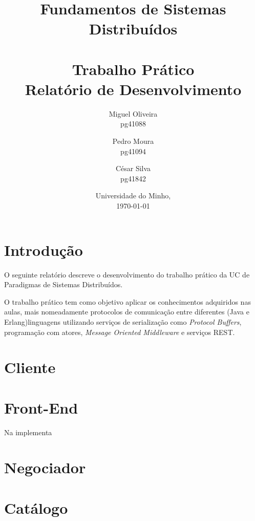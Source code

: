 \documentclass[12pt, a4paper]{report}
\begin{document}
\title{
    Fundamentos de Sistemas Distribuídos\\
    \textbf{\\Trabalho Prático}
    \large{\\Relatório de Desenvolvimento}
}

\author{
    Miguel Oliveira\\ pg41088
    \and Pedro Moura\\ pg41094
    \and César Silva\\ pg41842
}
\date{Universidade do Minho,\\\today}

\maketitle

\tableofcontents

\chapter{Introdução}
O seguinte relatório descreve o desenvolvimento do trabalho prático da UC de Paradigmas de Sistemas Distribuídos.

O trabalho prático tem como objetivo aplicar os conhecimentos adquiridos nas aulas, mais nomeadamente protocolos de comunicação entre diferentes  (Java e Erlang)linguagens utilizando serviços de serialização como \textit{Protocol Buffers}, programação com atores, \textit{Message Oriented Middleware} e serviços REST.


\chapter{Cliente}

\chapter{Front-End}

Na implementa

\chapter{Negociador}

\chapter{Catálogo}
\end{document}
